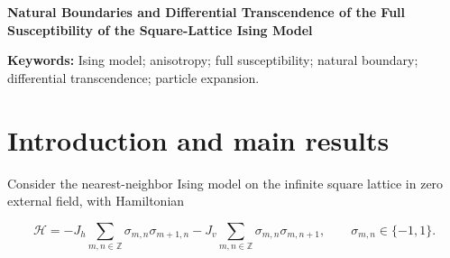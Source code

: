 \documentclass[11pt,a4paper]{article}
\numberwithin{equation}{section}
\theoremstyle{plain}
\theoremstyle{definition}
\begin{document}
\thispagestyle{plain}
\begin{center}
{\LARGE\bfseries Natural Boundaries and Differential Transcendence of the Full Susceptibility of the Square-Lattice Ising Model\par}
\end{center}
\vspace{.4em}
\begin{abstract} We establish the global complex-analytic structure and differential-algebraic properties of the full zero-field susceptibility of the nearest-neighbor Ising model on the infinite square lattice, with independently complexified horizontal and vertical couplings. The analyticity domains of the high- and low-temperature physical branches are characterized by the absence of spectral zeros. Their natural boundaries are analyzed using squared Vandermonde decay in the particle integrals, a Pfaffian identity derived directly from the dispersion relation, and uniform estimates on the particle tails. For real anisotropy, the method combines a common complex-momentum contour, exact Poisson summation, and phase alignment at the first resonant particle order. For nonreal anisotropy, it uses constrained Gaussian integrals and high-frequency Fourier asymptotics to treat the odd-particle constraint at negative spectral edges of the high-temperature branch. A boundary regularity criterion based on analytic ordinary differential equations establishes differential transcendence for each fixed positive physical coupling ratio. A formal-series criterion exploiting root-of-unity poles in the weak-coupling coefficients excludes all finite-order algebraic partial differential equations in the two independent couplings.\end{abstract}

\noindent\textbf{Keywords:} Ising model; anisotropy; full susceptibility; natural boundary; differential transcendence; particle expansion.
\vspace{.6em}
\section{Introduction and main results}\label{sec:intro}

Consider the nearest-neighbor Ising model on the infinite square lattice in zero external field, with Hamiltonian

\[\mathcal H=-J_h\sum_{m,n\in\mathbb Z}\sigma_{m,n}\sigma_{m+1,n}-J_v\sum_{m,n\in\mathbb Z}\sigma_{m,n}\sigma_{m,n+1},\qquad \sigma_{m,n}\in\{-1,1\}.\]
\end{document}
